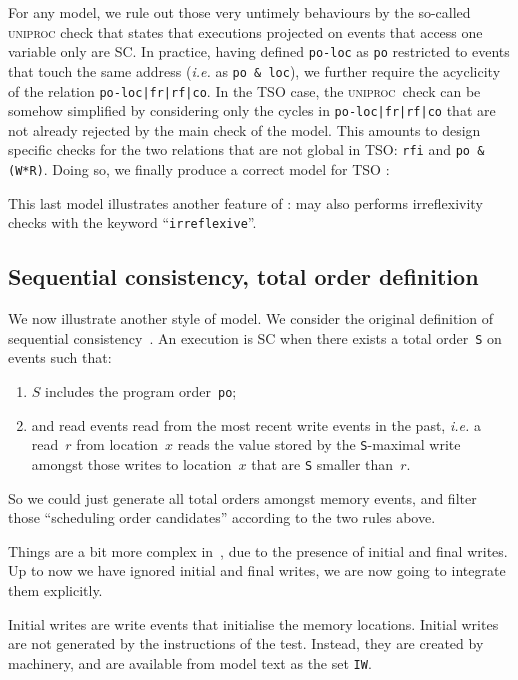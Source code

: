 \label{defuniproc}For any model, we rule out those very
untimely behaviours by the so-called
\textsc{uniproc}
check that states that executions projected on events that access one variable
only are SC.
In practice, having defined \verb+po-loc+ as \verb+po+ restricted to
events that touch the same address (\emph{i.e.}
as \verb+po & loc+), we further require the acyclicity
of the relation \verb+po-loc|fr|rf|co+.
In the TSO case, the \textsc{uniproc}~check can be
somehow simplified by considering only
the cycles in \verb+po-loc|fr|rf|co+ that 
are not already rejected by the main check of the model.
This amounts to design specific checks for the two relations that are
not global in TSO: \verb+rfi+ and \verb+po & (W*R)+.
Doing so, we finally produce a correct model for TSO :

This last model illustrates another feature of \cat{}:
\herd{} may also performs irreflexivity checks with the keyword
``\verb+irreflexive+''.

\subsection{Sequential consistency, total order definition}
We now illustrate another style of model.
We consider the original definition of sequential consistency~\cite{lam79}.
An execution is SC when there exists a total order~\verb+S+ on events such that:
\begin{enumerate}
\item $S$ includes the program order~\verb+po+;
\item \label{rfcond}and read events read from the most recent write events in the past,
\emph{i.e.} a read~$r$ from location~$x$ reads the value stored by
the \verb+S+-maximal write amongst those writes to location~$x$
that are \verb+S+ smaller than~$r$.
\end{enumerate}
So we could just generate all total orders amongst memory events,
and filter those ``scheduling order candidates'' according to the two rules
above.

\label{sec:final:initial}Things are a bit more complex in~\herd{}, due to the presence of initial and final writes.
Up to now we have ignored initial and final writes, we are now going to
integrate them explicitly.

Initial writes are write events that initialise the memory locations.
Initial writes are not generated by the instructions of the test.
Instead, they are created by \herd{} machinery, and are available
from model text as the set \verb+IW+.


